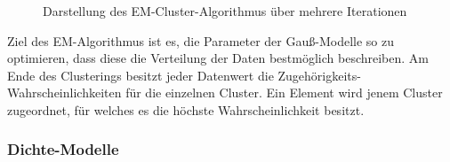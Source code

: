 \begin{figure}[H]
    \centering
    \caption[Darstellung des EM-Cluster-Algorithmus über mehrere Iterationen]{Darstellung des EM-Cluster-Algorithmus über mehrere Iterationen \cite[]{GeorgeSeif2018}}
    \label{fig:grund_em_clustering}
\end{figure}

Ziel des EM-Algorithmus ist es, die Parameter der Gauß-Modelle so zu optimieren, dass diese die Verteilung der Daten bestmöglich beschreiben.
Am Ende des Clusterings besitzt jeder Datenwert die Zugehörigkeits-Wahrscheinlichkeiten für die einzelnen Cluster.
Ein Element wird jenem Cluster zugeordnet, für welches es die höchste Wahrscheinlichkeit besitzt.

\subsubsection{Dichte-Modelle}
\label{sec:grund_density_clustering}

